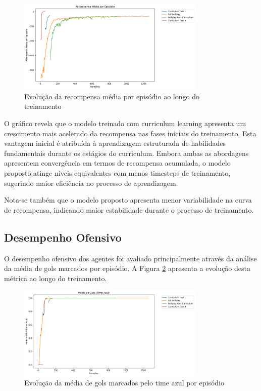 \begin{figure}[H]
    \centering
    \includegraphics[width=0.8\textwidth]{fig/graficos_trabalho/graficos_experimentos/geral/episode_reward_mean.png}
    \caption{Evolução da recompensa média por episódio ao longo do treinamento}
    \label{fig:episode_reward}
\end{figure}

O gráfico revela que o modelo treinado com curriculum learning apresenta um crescimento mais acelerado da recompensa nas fases iniciais do treinamento. Esta vantagem inicial é atribuída à aprendizagem estruturada de habilidades fundamentais durante os estágios do curriculum. Embora ambas as abordagens apresentem convergência em termos de recompensa acumulada, o modelo proposto atinge níveis equivalentes com menos timesteps de treinamento, sugerindo maior eficiência no processo de aprendizagem.

Nota-se também que o modelo proposto apresenta menor variabilidade na curva de recompensa, indicando maior estabilidade durante o processo de treinamento.

\subsection{Desempenho Ofensivo}

O desempenho ofensivo dos agentes foi avaliado principalmente através da análise da média de gols marcados por episódio. A Figura \ref{fig:goals_blue} apresenta a evolução desta métrica ao longo do treinamento.

\begin{figure}[H]
    \centering
    \includegraphics[width=0.8\textwidth]{fig/graficos_trabalho/graficos_experimentos/geral/custom_metricsgoals_blue_mean.png}
    \caption{Evolução da média de gols marcados pelo time azul por episódio}
    \label{fig:goals_blue}
\end{figure}

